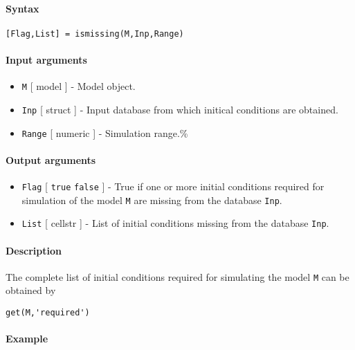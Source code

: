 


	\paragraph{Syntax}

\begin{verbatim}
[Flag,List] = ismissing(M,Inp,Range)
\end{verbatim}

\paragraph{Input arguments}

\begin{itemize}
\item
  \texttt{M} {[} model {]} - Model object.
\item
  \texttt{Inp} {[} struct {]} - Input database from which initical
  conditions are obtained.
\item
  \texttt{Range} {[} numeric {]} - Simulation range.\%
\end{itemize}

\paragraph{Output arguments}

\begin{itemize}
\item
  \texttt{Flag} {[} \texttt{true} \textbar{} \texttt{false} {]} - True
  if one or more initial conditions required for simulation of the model
  \texttt{M} are missing from the database \texttt{Inp}.
\item
  \texttt{List} {[} cellstr {]} - List of initial conditions missing
  from the database \texttt{Inp}.
\end{itemize}

\paragraph{Description}

The complete list of initial conditions required for simulating the
model \texttt{M} can be obtained by

\begin{verbatim}
get(M,'required')
\end{verbatim}

\paragraph{Example}


